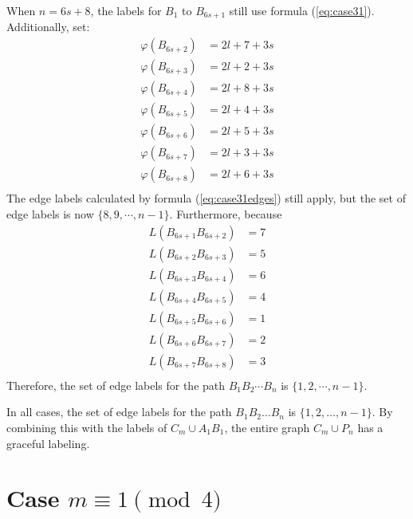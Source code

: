 \documentclass[fleqn,svgnames,screen,acmsmall]{ml2rcn}
\begin{document}
\begin{description}
\vspace{0.5\baselineskip}

\item[Case (3-6)] When $n = 6s + 8$, the labels for $B_{1}$ to $B_{6s+1}$ still use formula (\ref{eq:case31}). Additionally, set:
\[
\begin{aligned}
\varphi(B_{6s+2}) &= 2l + 7 + 3s \\
\varphi(B_{6s+3}) &= 2l + 2 + 3s \\
\varphi(B_{6s+4}) &= 2l + 8 + 3s \\
\varphi(B_{6s+5}) &= 2l + 4 + 3s \\
\varphi(B_{6s+6}) &= 2l + 5 + 3s \\
\varphi(B_{6s+7}) &= 2l + 3 + 3s \\
\varphi(B_{6s+8}) &= 2l + 6 + 3s \\
\end{aligned}
\]
The edge labels calculated by formula (\ref{eq:case31edges}) still apply, but the set of edge labels is now $\{8, 9, \cdots, n-1\}$. Furthermore, because
\[
\begin{aligned}
L(B_{6s+1}B_{6s+2}) &= 7 \\
L(B_{6s+2}B_{6s+3}) &= 5 \\
L(B_{6s+3}B_{6s+4}) &= 6 \\
L(B_{6s+4}B_{6s+5}) &= 4 \\
L(B_{6s+5}B_{6s+6}) &= 1 \\
L(B_{6s+6}B_{6s+7}) &= 2 \\
L(B_{6s+7}B_{6s+8}) &= 3 \\
\end{aligned}
\]
Therefore, the set of edge labels for the path $B_{1}B_{2}\cdots B_{n}$ is $\{1, 2, \cdots, n-1\}$.

\vspace{0.5\baselineskip}

\end{description}

In all cases, the set of edge labels for the path
\(B_{1}B_{2} \ldots B_{n}\) is \(\{1, 2, \ldots, n-1\}\). By combining
this with the labels of \(C_{m} \cup A_{1}B_{1}\), the entire graph
\(C_{m} \cup P_{n}\) has a graceful labeling.

\section{\texorpdfstring{Case
\(m \equiv 1 \pmod 4\)}{Case m \textbackslash equiv 1 \textbackslash pmod 4}}\label{theorem-2-case-m-equiv-1-pmod-4}
\end{document}
